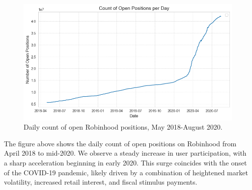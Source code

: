 \begin{figure}[H]
    \centering
    \includegraphics[width=1\linewidth]{../images/old/no_positions_date.png}
    \caption{Daily count of open Robinhood positions, May 2018-August 2020.}
\end{figure}

The figure above shows the daily count of open positions on Robinhood from April 2018 to mid-2020. 
We observe a steady increase in user participation, with a sharp acceleration beginning in early 2020. 
This surge coincides with the onset of the COVID-19 pandemic, likely driven by a combination of heightened market volatility, increased retail interest, and fiscal stimulus payments.
